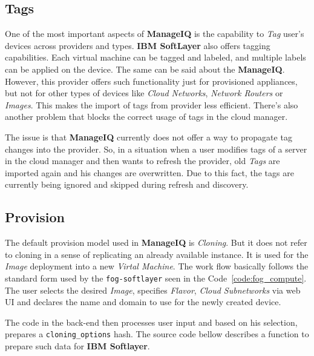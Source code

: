\subsection{Tags}
\label{sub:Tags}

One of the most important aspects of \textbf{ManageIQ} is the capability to \emph{Tag} user's devices across providers and types. \textbf{IBM SoftLayer} also offers tagging capabilities. Each virtual machine can be tagged and labeled, and multiple labels can be applied on the device. The same can be said about the \textbf{ManageIQ}. However, this provider offers such functionality just for provisioned appliances, but not for other types of devices like \emph{Cloud Networks}, \emph{Network Routers} or \emph{Images}. This makes the import of tags from provider less efficient. There's also another problem that blocks the correct usage of tags in the cloud manager.

The issue is that \textbf{ManageIQ} currently does not offer a way to propagate tag changes into the provider. So, in a situation when a user modifies tags of a server in the cloud manager and then wants to refresh the provider, old \emph{Tags} are imported again and his changes are overwritten. Due to this fact, the tags are currently being ignored and skipped during refresh and discovery.

\clearpage
\subsection{Provision}
\label{sub:Provision}

The default provision model used in \textbf{ManageIQ} is \emph{Cloning}. But it does not refer to cloning in a sense of replicating an already available instance. It is used for the \emph{Image} deployment into a new \emph{Virtal Machine}.
The work flow basically follows the standard form used by the \texttt{fog-softlayer} seen in the Code~\ref{code:fog_compute}. The user selects the desired \emph{Image}, specifies \emph{Flavor}, \emph{Cloud Subnetworks} via web UI and declares the name and domain to use for the newly created device.

The code in the back-end then processes user input and based on his selection, prepares a \verb|cloning_options| hash. The source code bellow describes a function to prepare such data for \textbf{IBM Softlayer}.

